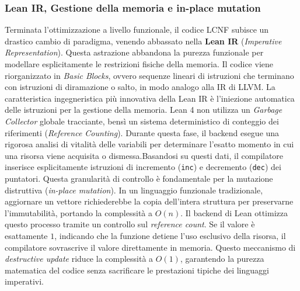 
\subsubsection{Lean IR, Gestione della memoria e in-place mutation}
Terminata l'ottimizzazione a livello funzionale, il codice LCNF subisce un drastico cambio di paradigma, venendo abbassato nella \textbf{Lean IR} (\textit{Imperative Representation}). Questa astrazione abbandona la purezza 
funzionale per modellare esplicitamente le restrizioni fisiche della memoria. Il codice viene riorganizzato in \textit{Basic Blocks}, ovvero sequenze lineari di istruzioni che terminano con istruzioni di diramazione o salto, 
in modo analogo alla IR di LLVM. La caratteristica ingegneristica più innovativa della Lean IR è l'iniezione automatica delle istruzioni per la gestione della memoria. Lean 4 non utilizza un \textit{Garbage Collector} globale 
tracciante, bensì un sistema deterministico di conteggio dei riferimenti (\emph{Reference Counting}). Durante questa fase, il backend esegue una rigorosa analisi di vitalità delle variabili per determinare l'esatto momento in 
cui una risorsa viene acquisita o dismessa.Basandosi su questi dati, il compilatore inserisce esplicitamente istruzioni di incremento (\texttt{inc}) e decremento (\texttt{dec}) dei puntatori. Questa granularità di controllo è 
fondamentale per la mutazione distruttiva (\emph{in-place mutation}). In un linguaggio funzionale tradizionale, aggiornare un vettore richiederebbe la copia dell'intera struttura per preservarne l'immutabilità, portando la 
complessità a $O(n)$. Il backend di Lean ottimizza questo processo tramite un controllo sul \textit{reference count}. Se il valore è esattamente $1$, indicando che la funzione detiene l'uso esclusivo della risorsa, il compilatore 
sovrascrive il valore direttamente in memoria. Questo meccanismo di \textit{destructive update} riduce la complessità a $O(1)$, garantendo la purezza matematica del codice senza sacrificare le prestazioni tipiche dei linguaggi imperativi.

